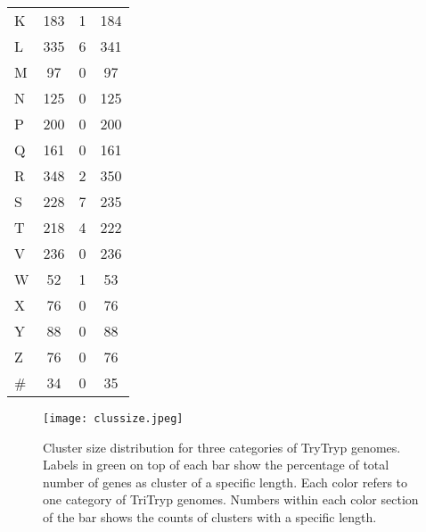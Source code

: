 \documentclass[table,
12pt, %
a4paper, %
oneside, %
headinclude,footinclude, %
BCOR5mm, %
]{scrartcl}
\begin{document}
\begin{table}[htbp]
\begin{adjustbox}{center}
\begin{tabular}{|lccc|}
      K               & 183          & 1       & 184   \\
      L               & 335          & 6       & 341   \\
      M               & 97           & 0       & 97    \\
      N               & 125          & 0       & 125   \\
      P               & 200          & 0       & 200   \\
      Q               & 161          & 0       & 161   \\
      R               & 348          & 2       & 350   \\
      S               & 228          & 7       & 235   \\
      T               & 218          & 4       & 222   \\
      V               & 236          & 0       & 236   \\
      W               & 52           & 1       & 53    \\
      X               & 76           & 0       & 76    \\
      Y               & 88           & 0       & 88    \\
      Z               & 76           & 0       & 76    \\
      \#              & 34           & 0       & 35    \\
      \hline
    \end{tabular}
    \label{table:genesummery}
  \end{adjustbox}
\end{table}


\begin{figure}[tb]
  \centering
  \texttt{[image: clussize.jpeg]}
  \caption[Genome Comparison]{Cluster size distribution for three categories of TryTryp genomes. Labels in green on top of each bar show the percentage of total number of genes as cluster of a specific length. Each color refers to one category of TriTryp genomes. Numbers within each color section of the bar shows the counts of clusters with a specific length.}
  \label{fig:clussize}
\end{figure}
\end{document}
